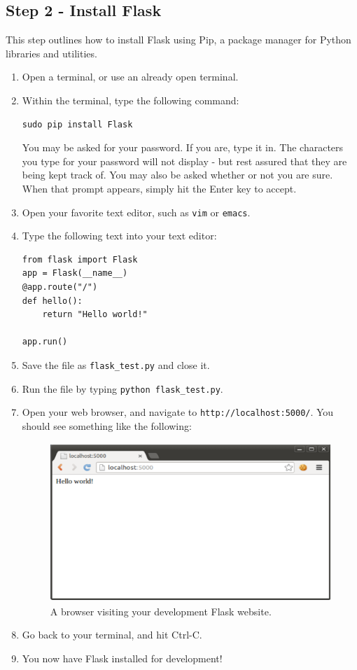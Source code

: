 \documentclass{article}
\begin{document}
\subsection{Step 2 - Install Flask}
This step outlines how to install Flask using Pip, a package manager for Python libraries and utilities.
\begin{enumerate}
\item Open a terminal, or use an already open terminal.
\item Within the terminal, type the following command:
\begin{verbatim}
sudo pip install Flask
\end{verbatim}
You may be asked for your password. If you are, type it in. The characters you type for your password
will not display - but rest assured that they are being kept track of. You
may also be asked whether or not you  are sure. When that prompt appears, 
simply hit the Enter key to accept.
\item Open your favorite text editor, such as \verb+vim+ or \verb+emacs+. \pagebreak
\item Type the following text into your text editor:
\begin{verbatim}
from flask import Flask
app = Flask(__name__)
@app.route("/")
def hello():
    return "Hello world!"

app.run()
\end{verbatim}
\item Save the file as \verb+flask_test.py+ and close it.
\item Run the file by typing \verb+python flask_test.py+.
\item Open your web browser, and navigate to \verb+http://localhost:5000/+. You should see something like the following:

\begin{figure}[h!]
\centering \includegraphics[height=6cm]{pic2.png} \caption{A browser visiting your development Flask website.}
\end{figure}
\item Go back to your terminal, and hit Ctrl-C.
\item You now have Flask installed for development!
\end{enumerate}
\end{document}
